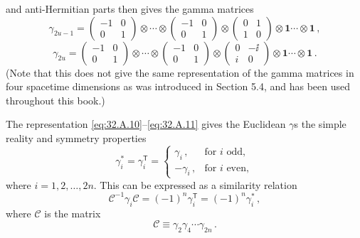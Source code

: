 and anti-Hermitian parts then gives the gamma matrices
\begin{equation}
  \gamma_{2u-1}=
  \begin{pmatrix}
    -1&0\\
    0&1
  \end{pmatrix}
  \otimes\cdots\otimes
  \begin{pmatrix}
    -1&0\\
    0&1
  \end{pmatrix}
  \otimes
  \begin{pmatrix}
    0&1\\
    1&0
  \end{pmatrix}
  \otimes\mathbf{1}\cdots\otimes\mathbf{1}\,,
  \tag{32.A.10}\label{eq:32.A.10}
\end{equation}
\begin{equation}
  \gamma_{2u}=
  \begin{pmatrix}
    -1&0\\
    0&1
  \end{pmatrix}
  \otimes\cdots\otimes
  \begin{pmatrix}
    -1&0\\
    0&1
  \end{pmatrix}
  \otimes
  \begin{pmatrix}
    0&-\ii\\
    i&0
  \end{pmatrix}
  \otimes\mathbf{1}\cdots\otimes\mathbf{1}\,.
  \tag{32.A.11}\label{eq:32.A.11}
\end{equation}
(Note that this does not give the same representation of the gamma matrices
in four spacetime dimensions as was introduced in Section 5.4, and has been
used throughout this book.)

The representation \eqref{eq:32.A.10}--\eqref{eq:32.A.11} gives the
Euclidean \(\gamma\)s the simple reality and symmetry properties
\begin{equation}
  \gamma_i^*=\gamma_i^{\mathsf T}
  =
  \begin{cases}
    \gamma_i\,,&\text{for \(i\) odd},\\
    -\gamma_i\,,&\text{for \(i\) even},
  \end{cases}
  \tag{32.A.12}\label{eq:32.A.12}
\end{equation}
where \(i=1,2,\ldots,2n\). This can be expressed as a similarity relation
\begin{equation}
  \mathcal C^{-1}\gamma_i\mathcal C
  =(-1)^n\gamma_i^{\mathsf T}
  =(-1)^n\gamma_i^*\,,
  \tag{32.A.13}\label{eq:32.A.13}
\end{equation}
where \(\mathcal C\) is the matrix
\begin{equation}
  \mathcal C\equiv\gamma_2\gamma_4\cdots\gamma_{2n}\,.
  \tag{32.A.14}\label{eq:32.A.14}
\end{equation}

